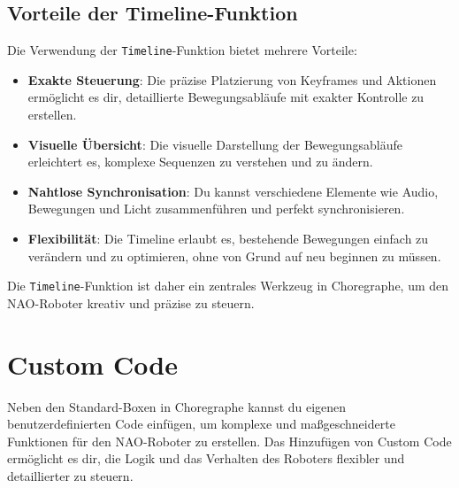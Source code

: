 \subsection{Vorteile der Timeline-Funktion}
Die Verwendung der \texttt{Timeline}-Funktion bietet mehrere Vorteile:
\begin{itemize}
    \item \textbf{Exakte Steuerung}: Die präzise Platzierung von Keyframes und Aktionen ermöglicht es dir, detaillierte Bewegungsabläufe mit exakter Kontrolle zu erstellen.
    \item \textbf{Visuelle Übersicht}: Die visuelle Darstellung der Bewegungsabläufe erleichtert es, komplexe Sequenzen zu verstehen und zu ändern.
    \item \textbf{Nahtlose Synchronisation}: Du kannst verschiedene Elemente wie Audio, Bewegungen und Licht zusammenführen und perfekt synchronisieren.
    \item \textbf{Flexibilität}: Die Timeline erlaubt es, bestehende Bewegungen einfach zu verändern und zu optimieren, ohne von Grund auf neu beginnen zu müssen.
\end{itemize}

Die \texttt{Timeline}-Funktion ist daher ein zentrales Werkzeug in Choregraphe, um den NAO-Roboter kreativ und präzise zu steuern.

\section{Custom Code}
Neben den Standard-Boxen in Choregraphe kannst du eigenen benutzerdefinierten Code einfügen, um komplexe und maßgeschneiderte Funktionen für den NAO-Roboter zu erstellen. Das Hinzufügen von Custom Code ermöglicht es dir, die Logik und das Verhalten des Roboters flexibler und detaillierter zu steuern.


